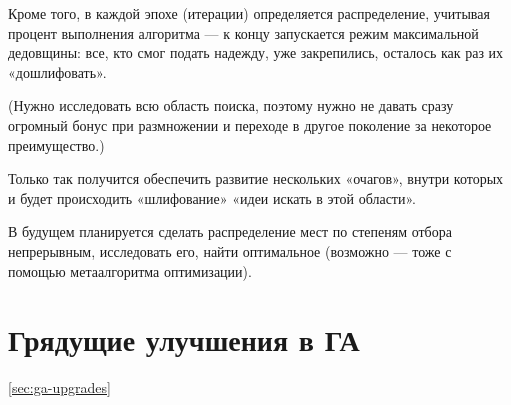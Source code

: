 Кроме того, в каждой эпохе (итерации) определяется распределение, учитывая процент выполнения алгоритма
— к концу запускается режим максимальной дедовщины: все, кто смог подать надежду, уже закрепились, осталось как раз их «дошлифовать».

(Нужно исследовать всю область поиска,
поэтому нужно не давать сразу огромный бонус при размножении и переходе в другое поколение за некоторое преимущество.)

Только так получится обеспечить развитие нескольких «очагов», внутри которых и будет происходить «шлифование» «идеи искать в этой области».

В будущем планируется сделать распределение мест по степеням отбора непрерывным,
исследовать его, найти оптимальное (возможно — тоже с помощью метаалгоритма оптимизации).


\section{Грядущие улучшения в ГА}\ref{sec:ga-upgrades}

